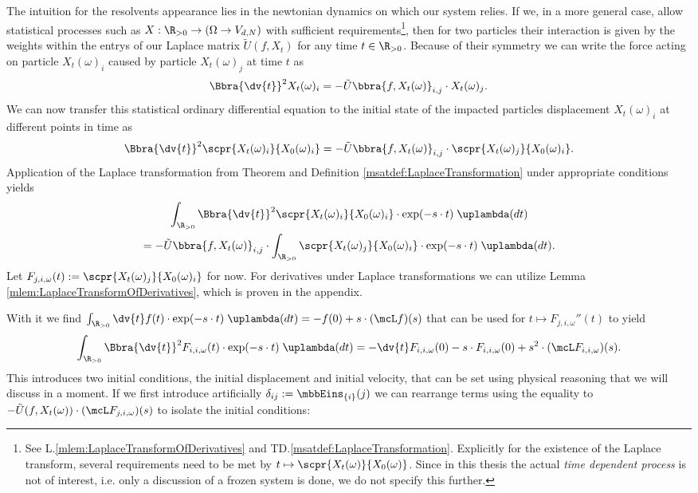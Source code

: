 The intuition for the resolvents appearance lies in the newtonian dynamics on which our system relies. If we, in a more general case, allow statistical processes such as $X:\R_{>0}\to (\Omega\to V_{d,N})$ with sufficient requirements\footnote{See L.\ref{mlem:LaplaceTransformOfDerivatives} and TD.\ref{msatdef:LaplaceTransformation}. Explicitly for the existence of the Laplace transform, several requirements need to be met by $t\mapsto \scpr{X_t(\omega)}{X_0(\omega)}$. Since in this thesis the actual \emph{time dependent process} is not of interest, i.e. only a discussion of a frozen system is done, we do not specify this further.}, then for two particles their interaction is given by the weights within the entrys of our Laplace matrix $\tilde U(f,X_t)$ for any time $t\in\R_{>0}$. Because of their symmetry we can write the force acting on particle $X_t(\omega)_i$ caused by particle $X_t(\omega)_j$ at time $t$ as
\[
    \Bbra{\dv{t}}^2X_t(\omega)_i = -\tilde U\bbra{f,X_t(\omega)}_{i,j}\cdot  X_t(\omega)_j.
\]
We can now transfer this statistical ordinary differential equation to the initial state of the impacted particles displacement $X_t(\omega)_i$ at different points in time as 
\[
    \Bbra{\dv{t}}^2\scpr{X_t(\omega)_i}{X_0(\omega)_i} = -\tilde U\bbra{f,X_t(\omega)}_{i,j}\cdot\scpr{X_t(\omega)_j}{X_0(\omega)_i}.
\] 
Application of the Laplace transformation from Theorem and Definition \ref{msatdef:LaplaceTransformation} under appropriate conditions yields
\begin{multline*}
    \int_{\R_{>0}}\Bbra{\dv{t}}^2\scpr{X_t(\omega)_i}{X_0(\omega)_i}\cdot\exp(-s\cdot t)\;\uplambda(dt) \\
    = -\tilde U\bbra{f,X_t(\omega)}_{i,j}\cdot\int_{\R_{>0}}\scpr{X_t(\omega)_j}{X_0(\omega)_i}\cdot\exp(-s\cdot t)\;\uplambda(dt).
\end{multline*}
Let $F_{j,i,\omega}(t):=\scpr{X_t(\omega)_j}{X_0(\omega)_i}$ for now. For derivatives under Laplace transformations we can utilize Lemma \ref{mlem:LaplaceTransformOfDerivatives}, which is proven in the appendix.

With it we find $\int_{\R_{>0}}\dv{t}f(t)\cdot\exp(-s\cdot t)\;\uplambda(dt) = -f(0) + s\cdot (\mcL f)(s)$ that can be used for $t\mapsto F_{j,i,\omega}''(t)$ to yield
\[
    \int_{\R_{>0}}\Bbra{\dv{t}}^2F_{i,i,\omega}(t)\cdot\exp(-s\cdot t)\;\uplambda(dt) = -\dv{t}F_{i,i,\omega}(0) - s\cdot F_{i,i,\omega}(0) + s^2\cdot(\mcL F_{i,i,\omega})(s). 
\] 
This introduces two initial conditions, the initial displacement and initial velocity, that can be set using physical reasoning that we will discuss in a moment. If we first introduce artificially $\delta_{ij}:=\mbbEins_{\{i\}}(j)$ we can rearrange terms using the equality to $-\tilde U(f,X_t(\omega))\cdot (\mcL F_{j,i,\omega})(s)$ to isolate the initial conditions: 
